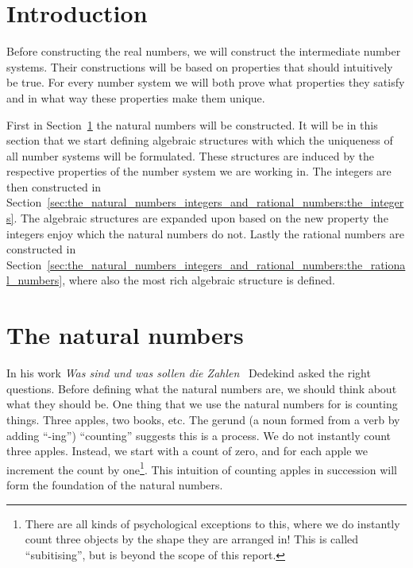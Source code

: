 \documentclass[../main.tex]{subfiles}
\begin{document}
\section*{Introduction}
Before constructing the real numbers, we will construct the intermediate number systems. Their constructions will be based on properties that should intuitively be true. For every number system we will both prove what properties they satisfy and in what way these properties make them unique.

First in Section~\ref{sec:the_natural_numbers_integers_and_rational_numbers:the_natural_numbers} the natural numbers will be constructed. It will be in this section that we start defining algebraic structures with which the uniqueness of all number systems will be formulated. These structures are induced by the respective properties of the number system we are working in. The integers are then constructed in Section~\ref{sec:the_natural_numbers_integers_and_rational_numbers:the_integers}. The algebraic structures are expanded upon based on the new property the integers enjoy which the natural numbers do not. Lastly the rational numbers are constructed in Section~\ref{sec:the_natural_numbers_integers_and_rational_numbers:the_rational_numbers}, where also the most rich algebraic structure is defined.

\section{The natural numbers}\label{sec:the_natural_numbers_integers_and_rational_numbers:the_natural_numbers}
In his work \textit{\textgerman{Was sind und was sollen die Zahlen}}~\cite{Dedekind1888} Dedekind asked the right questions. Before defining what the natural numbers are, we should think about what they should be. One thing that we use the natural numbers for is counting things. Three apples, two books, etc. The gerund (a noun formed from a verb by adding ``-ing'') ``counting'' suggests this is a process. We do not instantly count three apples. Instead, we start with a count of zero, and for each apple we increment the count by one\footnote{There are all kinds of psychological exceptions to this, where we do instantly count three objects by the shape they are arranged in! This is called ``subitising'', but is beyond the scope of this report.}. This intuition of counting apples in succession will form the foundation of the natural numbers.
\end{document}
